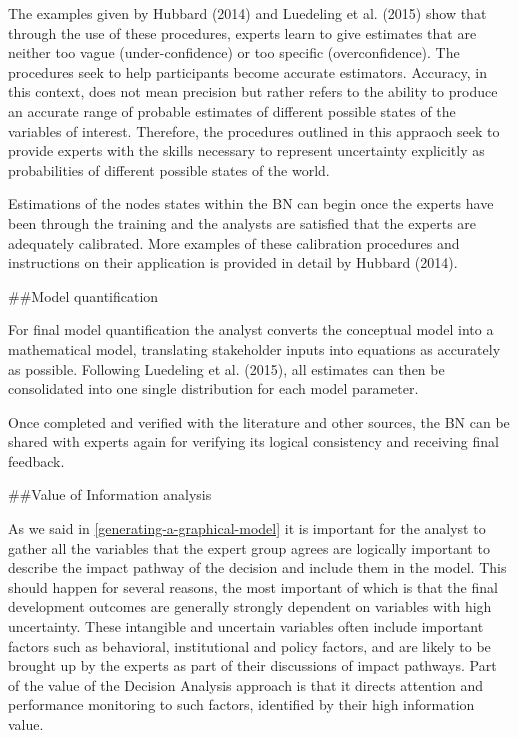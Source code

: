 \documentclass[
]{article}
\begin{document}
The examples given by Hubbard (2014) and Luedeling et al. (2015) show
that through the use of these procedures, experts learn to give
estimates that are neither too vague (under-confidence) or too specific
(overconfidence). The procedures seek to help participants become
accurate estimators. Accuracy, in this context, does not mean precision
but rather refers to the ability to produce an accurate range of
probable estimates of different possible states of the variables of
interest. Therefore, the procedures outlined in this appraoch seek to
provide experts with the skills necessary to represent uncertainty
explicitly as probabilities of different possible states of the world.

Estimations of the nodes states within the BN can begin once the experts
have been through the training and the analysts are satisfied that the
experts are adequately calibrated. More examples of these calibration
procedures and instructions on their application is provided in detail
by Hubbard (2014).

\#\#Model quantification

For final model quantification the analyst converts the conceptual model
into a mathematical model, translating stakeholder inputs into equations
as accurately as possible. Following Luedeling et al. (2015), all
estimates can then be consolidated into one single distribution for each
model parameter.

Once completed and verified with the literature and other sources, the
BN can be shared with experts again for verifying its logical
consistency and receiving final feedback.

\#\#Value of Information analysis

As we said in \autoref{generating-a-graphical-model} it is important for
the analyst to gather all the variables that the expert group agrees are
logically important to describe the impact pathway of the decision and
include them in the model. This should happen for several reasons, the
most important of which is that the final development outcomes are
generally strongly dependent on variables with high uncertainty. These
intangible and uncertain variables often include important factors such
as behavioral, institutional and policy factors, and are likely to be
brought up by the experts as part of their discussions of impact
pathways. Part of the value of the Decision Analysis approach is that it
directs attention and performance monitoring to such factors, identified
by their high information value.
\end{document}
